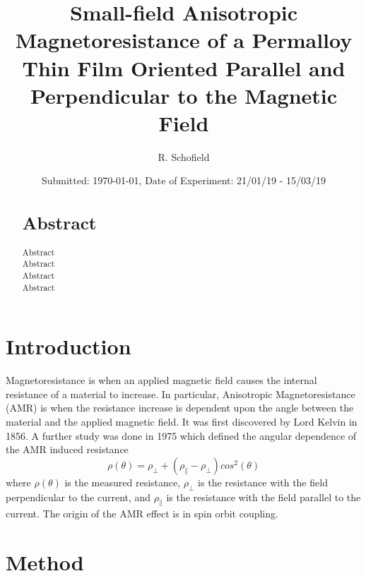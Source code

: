 \documentclass[10pt, twocolumn]{revtex4}
\begin{document}
\title{Small-field Anisotropic Magnetoresistance of a Permalloy Thin Film Oriented Parallel and Perpendicular to the Magnetic Field }
\date{Submitted: \today{}, Date of Experiment: 21/01/19 - 15/03/19}
\author{R. Schofield}


\begin{abstract}
\section*{Abstract}

Abstract\\
Abstract\\
Abstract\\
Abstract


\end{abstract}

\maketitle
\thispagestyle{plain}


\section{Introduction}

Magnetoresistance is when an applied magnetic field causes the internal resistance of a material to increase. In particular, Anisotropic Magnetoresistance (AMR) is when the resistance increase is dependent upon the angle between the material and the applied magnetic field. It was first discovered by Lord Kelvin in 1856.\cite{kelvinXIXElectrodynamicQualities1857} A further study was done in 1975 which defined the angular dependence of the AMR induced resistance
\begin{equation}
\rho(\theta) = \rho_\perp + (\rho_\parallel - \rho_\perp)cos^2(\theta)
\end{equation}
where $\rho(\theta)$ is the measured resistance, $\rho_\perp$ is the resistance with the field perpendicular to the current, and $\rho_\parallel$ is the resistance with the field parallel to the current.\cite{mcguireAnisotropicMagnetoresistanceFerromagnetic1975} The origin  of the AMR effect is in spin orbit coupling.\cite{Campbell_1970} %


\section{Method}
\end{document}
